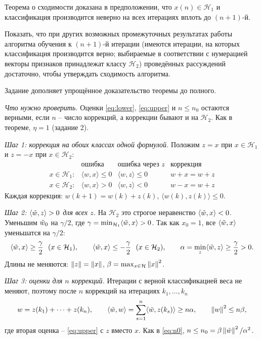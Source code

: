 \documentclass[12pt,a4paper]{article}
\begin{document}
\dano Теорема о сходимости доказана в предположении, что
$x(n) \in \mathcal{H}_1$ и классификация производится неверно на всех
итерациях вплоть до $(n+1)$-й.

\treb Показать, что при других возможных промежуточных результатах работы
алгоритма обучения к $(n+1)$-й итерации (имеются итерации, на которых
классификация производится верно; выбираемые в соответствии с нумерацией
векторы признаков принадлежат классу $\mathcal{H}_2$) проведённых рассуждений
достаточно, чтобы утверждать сходимость алгоритма.

\zachem Задание дополняет упрощённое доказательство теоремы до полного.

\resh \emph{Что нужно проверить.} Оценки \eqref{eq:lower}, \eqref{eq:upper} и
$n \le n_0$ остаются верными, если $n$ -- число коррекций, а коррекции бывают и
на $\mathcal{H}_2$. Как в теореме, $\eta = 1$ (задание 2).

\emph{Шаг 1: коррекция на обоих классах одной формулой.} Положим $z = x$ при
$x \in \mathcal{H}_1$ и $z = -x$ при $x \in \mathcal{H}_2$:
\[
  \begin{array}{lccc}
    & \text{ошибка} & \text{ошибка через } z & \text{коррекция}\\[1mm]
    x \in \mathcal{H}_1: & \langle w, x\rangle \le 0 & \langle w, z\rangle \le 0
      & w + x = w + z\\[1mm]
    x \in \mathcal{H}_2: & \langle w, x\rangle > 0 & \langle w, z\rangle < 0
      & w - x = w + z
  \end{array}
\]
Каждая коррекция: $w(k+1) = w(k) + z(k)$, $\langle w(k), z(k)\rangle \le 0$.

\emph{Шаг 2: $\langle \tilde{w}, z\rangle > 0$ для всех $z$.} На $\mathcal{H}_2$ это
строгое неравенство $\langle \tilde{w}, x\rangle < 0$. Уменьшим $\tilde{w}_0$ на
$\gamma/2$, где $\gamma = \min_{\mathcal{H}_1}\langle \tilde{w}, x\rangle > 0$. Так
как $x_0 = 1$, все $\langle \tilde{w}, x\rangle$ уменьшатся на $\gamma/2$:
\[
  \langle \est w, x\rangle \ge \frac\gamma2 \ \ (x \in \mathcal{H}_1),
  \qquad
  \langle \est w, x\rangle \le -\frac\gamma2 \ \ (x \in \mathcal{H}_2),
  \qquad
  \alpha = \min_z\langle \est w, z\rangle \ge \frac\gamma2 > 0 .
\]
Длины не меняются: $\left\lVert z \right\rVert = \left\lVert x \right\rVert$, $\beta = \max_{x \in \mathcal{H}}\left\lVert x \right\rVert^2$.

\emph{Шаг 3: оценки для $n$ коррекций.} Итерации с верной классификацией веса не
меняют, поэтому после $n$ коррекций на итерациях $k_1, \dots, k_n$
\[
  w = z(k_1) + \dots + z(k_n),
  \qquad
  \langle \tilde{w}, w\rangle = \sum_{s=1}^{n}\langle \tilde{w}, z(k_s)\rangle \ge n\alpha,
  \qquad
  \left\lVert w \right\rVert^2 \le n\beta ,
\]
где вторая оценка -- \eqref{eq:upper} с $z$ вместо $x$. Как в \eqref{eq:n0},
$n \le n_0 = \beta\left\lVert \tilde{w} \right\rVert^2/\alpha^2$.
\end{document}
